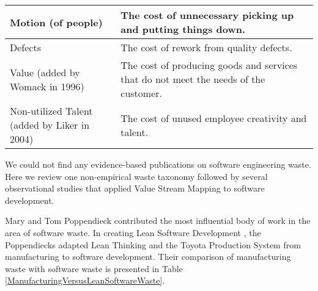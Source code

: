 \begin{table}[t]
\begin{tabular}{| >{\raggedright}m{1.15in}|p{2.00in}|}
Motion (of people)        & The cost of unnecessary picking up and putting things down.                                                                                                  \\ \hline
Defects                   & The cost of rework from quality defects.                                                                                                                     \\ \hline
Value (added by Womack in 1996)                     & The cost of producing goods and services that do not meet the needs of the customer.                                                                         \\ \hline
Non-utilized Talent (added by Liker in 2004)      & The cost of unused employee creativity and talent.                                                                                                           \\ \hline
\end{tabular}
\end{table}

We could not find any evidence-based publications on software engineering waste. Here we review one non-empirical waste taxonomy followed by several observational studies that applied Value Stream Mapping to software development.

Mary and Tom Poppendieck contributed the most influential body of work in the area of software waste. In creating Lean Software Development \cite{PoppendieckLeanSoftwareDevelopment}, the Poppendiecks adapted Lean Thinking and the Toyota Production System from manufacturing to software development. Their comparison of manufacturing waste with software waste is presented in Table \ref{ManufacturingVersusLeanSoftwareWaste}.

